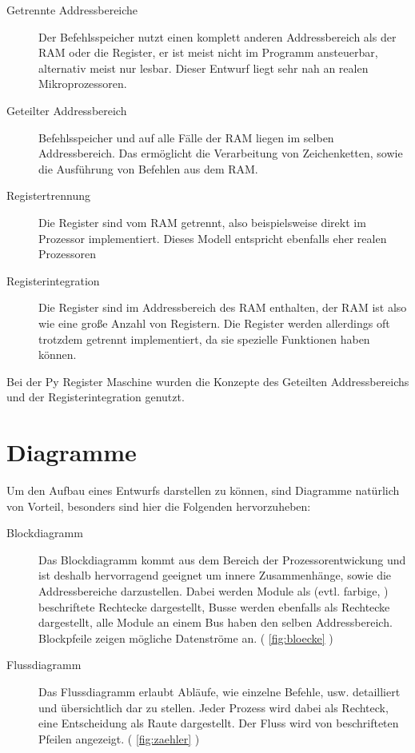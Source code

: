 \documentclass[a4paper,12pt,oneside]{scrreprt}
\begin{document}
\begin{description}

\item[Getrennte Addressbereiche] Der Befehlsspeicher nutzt einen komplett anderen Addressbereich als der RAM oder die Register, er ist meist nicht im Programm ansteuerbar, alternativ meist nur lesbar. Dieser Entwurf liegt sehr nah an realen Mikroprozessoren.

\item[Geteilter Addressbereich] Befehlsspeicher und auf alle Fälle der RAM liegen im selben Addressbereich. Das ermöglicht die Verarbeitung von Zeichenketten, sowie die Ausführung von Befehlen aus dem RAM.

\item[Registertrennung] Die Register sind vom RAM getrennt, also beispielsweise direkt im Prozessor implementiert. Dieses Modell entspricht ebenfalls eher realen Prozessoren

\item[Registerintegration] Die Register sind im Addressbereich des RAM enthalten, der RAM ist also wie eine große Anzahl von Registern. Die Register werden allerdings oft trotzdem getrennt implementiert, da sie spezielle Funktionen haben können.

\end{description}

Bei der Py Register Maschine wurden die Konzepte des Geteilten Addressbereichs und der Registerintegration genutzt.

\section{Diagramme}

Um den Aufbau eines Entwurfs darstellen zu können, sind Diagramme natürlich von Vorteil, besonders sind hier die Folgenden hervorzuheben:

\begin{description}

\item[Blockdiagramm] Das Blockdiagramm kommt aus dem Bereich der Prozessorentwickung und ist deshalb hervorragend geeignet um innere Zusammenhänge,
sowie die Addressbereiche darzustellen. Dabei werden Module als (evtl. farbige, ) beschriftete Rechtecke dargestellt, Busse werden ebenfalls als Rechtecke dargestellt, alle Module an einem Bus haben den selben Addressbereich.
Blockpfeile zeigen mögliche Datenströme an. ( \ref{fig:bloecke} )

\item[Flussdiagramm] Das Flussdiagramm erlaubt Abläufe, wie einzelne Befehle, usw. detailliert und übersichtlich dar zu stellen.
Jeder Prozess wird dabei als Rechteck, eine Entscheidung als Raute dargestellt. 
Der Fluss wird von beschrifteten Pfeilen angezeigt. ( \ref{fig:zaehler} )

\end{description}
\end{document}
